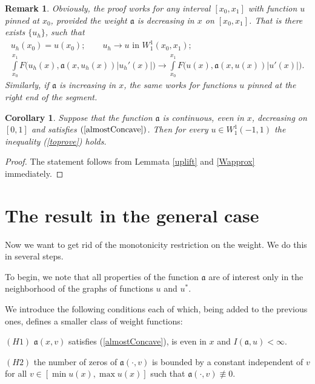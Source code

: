 \documentclass[12pt]{article}
\newcommand{\abs}[1]{\left\vert#1\right\vert}
\newtheorem{rem}{Remark}
\newtheorem{cor}{Corollary}
\newcommand{\W}{W_1^1}
\begin{document}
\begin{rem}
Obviously, the proof works for any interval $[x_0, x_1]$ with function $u$ pinned at $x_0$,
provided the weight $\mathfrak a$ is decreasing in $x$ on $[x_0, x_1]$.
That is there exists $\{u_h\}$, such that
\begin{gather*}
u_h(x_0) = u(x_0); \qquad u_h \to u \text{ in } \W(x_0, x_1);\\
\int\limits_{x_0}^{x_1} F\big( u_h(x), \mathfrak a(x, u_h(x)) \abs{u_h'(x)} \big) \to \int\limits_{x_0}^{x_1} F\big( u(x), \mathfrak a(x, u(x)) \abs{u'(x)} \big).
\end{gather*}
Similarly, if $\mathfrak a$ is increasing in $x$, the same works for functions $u$ pinned at the right end of the segment.
\end{rem}

\begin{cor}
Suppose that the function $\mathfrak a$ is continuous, even in $x$, decreasing on $[0, 1]$ and satisfies $(\ref{almostConcave})$.
Then for every $u \in \W(-1, 1)$ the inequality (\ref{toprove}) holds.
\end{cor}

\begin{proof}
The statement follows from Lemmata \ref{uplift} and \ref{Wapprox} immediately.
\end{proof}


\section{The result in the general case}
\label{moveForth}

Now we want to get rid of the monotonicity restriction on the weight.
We do this in several steps.

To begin, we note that all properties of the function $\mathfrak a$ are of interest
only in the neighborhood of the graphs of functions $u$ and $u^*$.

We introduce the following conditions each of which, being added to the previous ones, defines a smaller class of weight functions:

\bigskip

\smallskip
\noindent
$(H1)$ $\mathfrak a(x, v)$ satisfies (\ref{almostConcave}), is even in $x$ and $I(\mathfrak a, u) < \infty$.
\smallskip

\bigskip
\noindent
$(H2)$ the number of zeros of $\mathfrak a(\cdot, v)$ is bounded by a constant independent of $v$
for all $v \in [\min u(x), \max u(x)]$ such that $\mathfrak a(\cdot, v) \not \equiv 0$.
\end{document}
